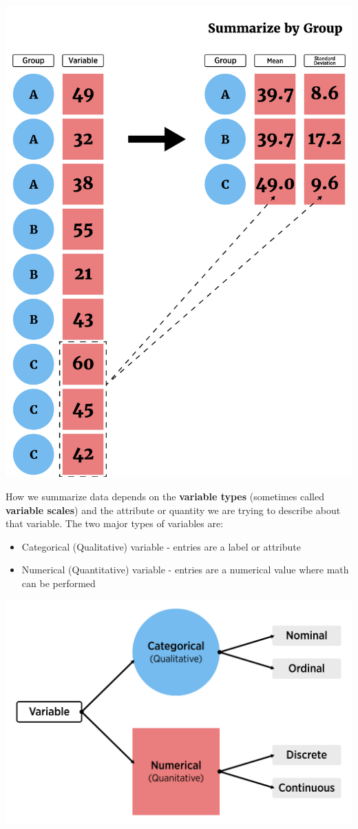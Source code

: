 \documentclass[
]{book}
\providecommand{\tightlist}{%
  \setlength{\itemsep}{0pt}\setlength{\parskip}{0pt}}
\theoremstyle{definition}
\theoremstyle{definition}
\theoremstyle{definition}
\theoremstyle{remark}
\begin{document}
\begin{center}\includegraphics[width=0.8\linewidth]{img/summarizeGroupsF} \end{center}

How we summarize data depends on the \textbf{variable types} (sometimes called \textbf{variable scales}) and the attribute or quantity we are trying to describe about that variable. The two major types of variables are:

\begin{itemize}
\tightlist
\item
  Categorical (Qualitative) variable - entries are a label or attribute\\
\item
  Numerical (Quantitative) variable - entries are a numerical value where math can be performed
\end{itemize}

\begin{center}\includegraphics[width=0.8\linewidth]{img/variableTypes} \end{center}
\end{document}
